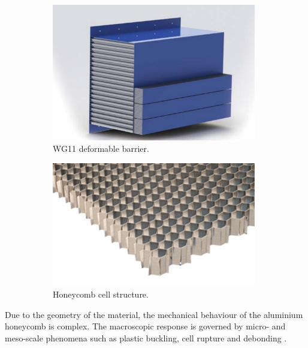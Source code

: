 \begin{figure}[H]
    \centering
    \begin{subfigure}[b]{0.54\textwidth}
    \centering
        \includegraphics[width=0.98\textwidth]{./Images/Ch1/Ch1_wg11.PNG}
        \caption{WG11 deformable barrier. \cite{plascore}}
        \label{Ch1_honeycombphoto1}
    \end{subfigure}
    \quad
    \begin{subfigure}[b]{0.32\textwidth}
        \includegraphics[width=0.98\textwidth]{./Images/Ch1/Ch1_honeycombphoto.jpg}
        \caption{Honeycomb cell structure. \cite{plascore}}
        \label{Ch1_honeycombphoto2}
    \end{subfigure}
    \caption{}
    \label{Ch1_honeycombphoto}
\end{figure}
Due to the geometry of the material, the mechanical behaviour of the aluminium honeycomb is complex. The macroscopic response is governed by micro- and meso-scale phenomena such as plastic buckling, cell rupture and debonding \cite{popp}.\\
